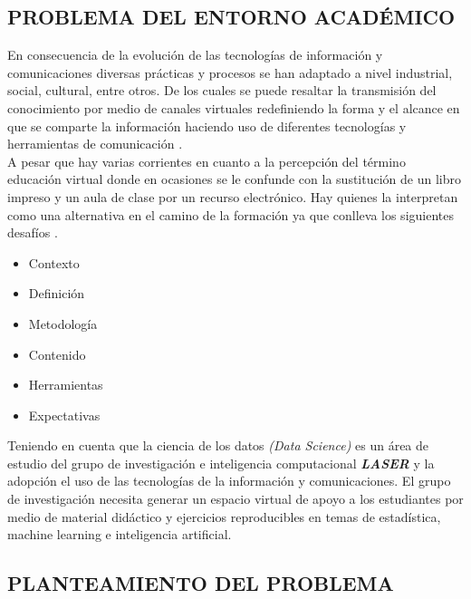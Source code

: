 \begin{center}
	\section{PROBLEMA DEL ENTORNO ACAD\'EMICO} 
\end{center}


\noindent
En consecuencia de la evoluci\'on de las tecnolog\'ias de informaci\'on y comunicaciones diversas pr\'acticas y procesos se han adaptado a nivel industrial, social, cultural, entre otros. De los cuales se puede resaltar la transmisi\'on del conocimiento por medio de canales virtuales redefiniendo la forma y el alcance en que se comparte la informaci\'on haciendo uso de diferentes tecnolog\'ias y herramientas de comunicaci\'on \cite{PsicologiaEducacionVirtual2009}. 
\\

\noindent
A pesar que hay varias corrientes en cuanto a la percepci\'on del t\'ermino educaci\'on virtual donde en ocasiones se le confunde con la sustituci\'on de un libro impreso y un aula de clase por un recurso electr\'onico. Hay quienes la interpretan como una alternativa en el camino de la formaci\'on ya que conlleva los siguientes desaf\'ios \cite{EducacionVirtualManuelUnigarro}.
\\
\begin{itemize}
	\item Contexto
	\item Definici\'on
	\item Metodolog\'ia
	\item Contenido
	\item Herramientas
	\item Expectativas
\end{itemize}

\noindent
Teniendo en cuenta que la ciencia de los datos \textit{(Data Science)} es un \'area de estudio del grupo de investigaci\'on e inteligencia computacional \textbf{\textit{LASER}} \cite{GrupoDeInvestigacionLaser} y la adopci\'on el uso de las tecnolog\'ias de la informaci\'on y comunicaciones. El grupo de investigaci\'on necesita generar un espacio virtual de apoyo a los estudiantes por medio de material did\'actico y ejercicios reproducibles en temas de estad\'istica, machine learning e inteligencia artificial.



\subsection{PLANTEAMIENTO DEL PROBLEMA}


